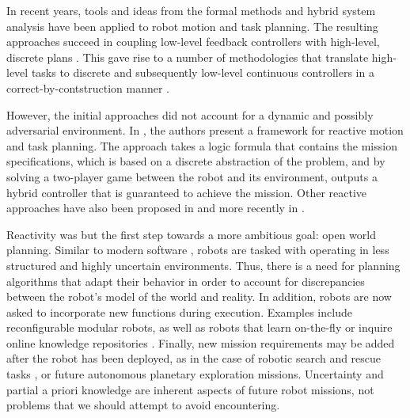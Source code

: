 In recent years, tools and ideas from the formal methods and hybrid system analysis have been applied to robot motion and task planning. The resulting approaches succeed in coupling low-level feedback controllers \cite{} with high-level, discrete plans \cite{}. This gave rise to a number of methodologies that translate high-level tasks to discrete and subsequently low-level continuous controllers in a correct-by-contstruction manner \cite{}.

However, the initial approaches did not account for a dynamic and possibly adversarial environment. In \cite{KGFP_TRO09}, the authors present a framework for reactive motion and task planning. The approach takes a logic formula that contains the mission specifications, which is based on a discrete abstraction of the problem, and by solving a two-player game between the robot and its environment, outputs a hybrid controller that is guaranteed to achieve the mission. Other reactive approaches have also been proposed in \cite{Wongpiromsarn2010} and more recently in \cite{Belta2013RSS}.

Reactivity was but the first step towards a more ambitious goal: open world planning. Similar to modern software \cite{open-world-sw}, robots are tasked with operating in less structured and highly uncertain environments. Thus, there is a need for planning algorithms that adapt their behavior in order to account for discrepancies between the robot's model of the world and reality. In addition, robots are now asked to incorporate new functions during execution. Examples include reconfigurable modular robots, as well as robots that learn on-the-fly \cite{SaxenaIJRR2012} or inquire online knowledge repositories \cite{rapyuta2013}. Finally, new mission requirements may be added after the robot has been deployed, as in the case of robotic search and rescue tasks \cite{MatthiasAI2010}, or future autonomous planetary exploration missions. Uncertainty and partial a priori knowledge are inherent aspects of future robot missions, not problems that we should attempt to avoid encountering.

